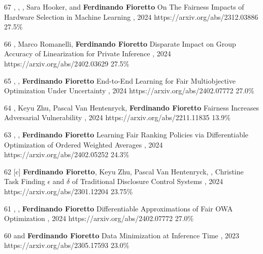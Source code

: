 \begin{pubs}
\confentry
	{67}
	{, , , Sara Hooker, and {\bf Ferdinando Fioretto}}
	{On The Fairness Impacts of Hardware Selection in Machine Learning}	
	{\procICML, 2024}
	{https://arxiv.org/abs/2312.03886}
	{27.5\%}

\confentry
	{66}
	{, Marco Romanelli, {\bf Ferdinando Fioretto}}
	{Disparate Impact on Group Accuracy of Linearization for Private Inference}
	{\procICML, 2024}
	{https://arxiv.org/abs/2402.03629}
	{27.5\%}

\confentry
	{65}
	{, , {\bf Ferdinando Fioretto}}
	{End-to-End Learning for Fair Multiobjective Optimization Under Uncertainty}
	{\procUAI, 2024}
	{https://arxiv.org/abs/2402.07772}
	{27.0\%}

\confentry
	{64}%
	{, Keyu Zhu, Pascal Van Hentenryck, {\bf Ferdinando Fioretto}}
	{Fairness Increases Adversarial Vulnerability}
	{\procIJCAI, 2024}
	{https://arxiv.org/abs/2211.11835}
	{13.9\%}

\confentry
	{63}
	{, , {\bf Ferdinando Fioretto}}
	{Learning Fair Ranking Policies via Differentiable Optimization of Ordered Weighted Averages}
	{\procFAccT, 2024}
	{https://arxiv.org/abs/2402.05252}
	{24.3\%}

\confentry
	{62}
	{[c] {\bf Ferdinando Fioretto}, Keyu Zhu, Pascal Van Hentenryck, , Christine Task}
  	{Finding $\epsilon$ and $\delta$ of Traditional Disclosure Control Systems}
	{\procAAAI, 2024}
	{https://arxiv.org/abs/2301.12204}
	{23.75\%}

\confentry
	{61}
	{, , {\bf Ferdinando Fioretto}}
	{Differentiable Approximations of Fair OWA Optimization}
	{, 2024}
	{https://arxiv.org/abs/2402.07772}
	{27.0\%}



\confentry
	{60}
	{ and {\bf Ferdinando Fioretto}}
	{Data Minimization at Inference Time}
	{\procNeurIPS, 2023}
	{https://arxiv.org/abs/2305.17593}
	{23.0\%}


\end{pubs}
